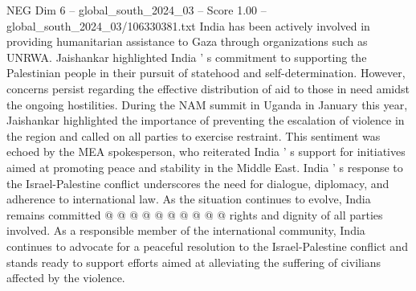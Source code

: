 \begin{textsample}{NEG Dim 6 – global\_south\_2024\_03 – Score 1.00 – global\_south\_2024\_03/106330381.txt}
India has been actively involved in providing humanitarian assistance to Gaza through organizations such as UNRWA.
Jaishankar highlighted India ' s commitment to supporting the Palestinian people in their pursuit of statehood and self-determination.
However, concerns persist regarding the effective distribution of aid to those in need amidst the ongoing hostilities.
During the NAM summit in Uganda in January this year, Jaishankar highlighted the importance of preventing the escalation of violence in the region and called on all parties to exercise restraint.
This sentiment was echoed by the MEA spokesperson, who reiterated India ' s support for initiatives aimed at promoting peace and stability in the Middle East.
India ' s response to the Israel-Palestine conflict underscores the need for dialogue, diplomacy, and adherence to international law.
As the situation continues to evolve, India remains committed @ @ @ @ @ @ @ @ @ @ rights and dignity of all parties involved.
As a responsible member of the international community, India continues to advocate for a peaceful resolution to the Israel-Palestine conflict and stands ready to support efforts aimed at alleviating the suffering of civilians affected by the violence.

\end{textsample}
